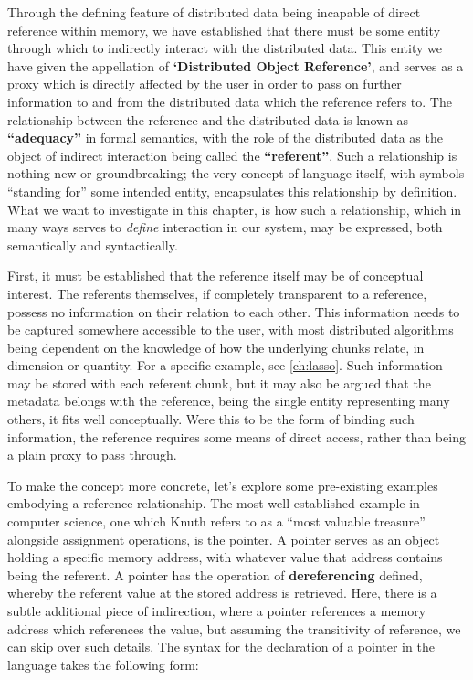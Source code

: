 Through the defining feature of distributed data being incapable of direct reference within memory, we have established that there must be some entity through which to indirectly interact with the distributed data.
This entity we have given the appellation of \textbf{`Distributed Object Reference'}, and serves as a proxy which is directly affected by the user in order to pass on further information to and from the distributed data which the reference refers to.
The relationship between the reference and the distributed data is known as \textbf{``adequacy''} in formal semantics, with the role of the distributed data as the object of indirect interaction being called the \textbf{``referent''}.
Such a relationship is nothing new or groundbreaking; the very concept of language itself, with symbols ``standing for'' some intended entity, encapsulates this relationship by definition.
What we want to investigate in this chapter, is how such a relationship, which in many ways serves to \emph{define} interaction in our system, may be expressed, both semantically and syntactically.

First, it must be established that the reference itself may be of conceptual interest.
The referents themselves, if completely transparent to a reference, possess no information on their relation to each other.
This information needs to be captured somewhere accessible to the user, with most distributed algorithms being dependent on the knowledge of how the underlying chunks relate, in dimension or quantity.
For a specific example, see \cref{ch:lasso}.
Such information may be stored with each referent chunk, but it may also be argued that the metadata belongs with the reference, being the single entity representing many others, it fits well conceptually.
Were this to be the form of binding such information, the reference requires some means of direct access, rather than being a plain proxy to pass through.

To make the concept more concrete, let's explore some pre-existing examples embodying a reference relationship.
The most well-established example in computer science, one which Knuth refers to as a ``most valuable treasure'' alongside assignment operations, is the pointer.
A pointer serves as an object holding a specific memory address, with whatever value that address contains being the referent.
A pointer has the operation of \textbf{dereferencing} defined, whereby the referent value at the stored address is retrieved.
Here, there is a subtle additional piece of indirection, where a pointer references a memory address which references the value, but assuming the transitivity of reference, we can skip over such details.
The syntax for the declaration of a pointer in the  language takes the following form:

